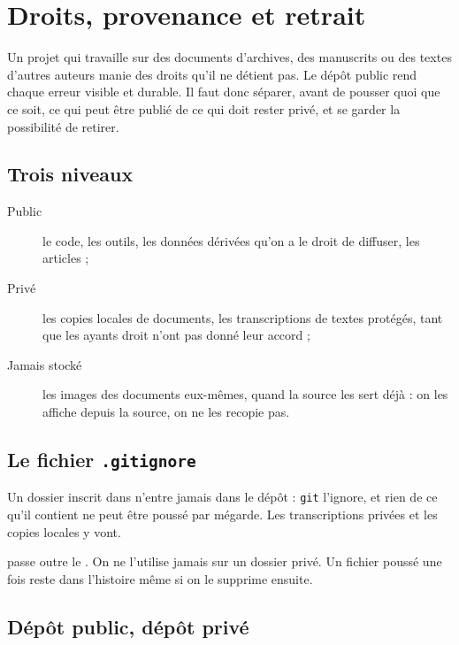 \chapter{Droits, provenance et retrait}\label{ch:droits}

Un projet qui travaille sur des documents d'archives, des manuscrits ou des textes
d'autres auteurs manie des droits qu'il ne détient pas. Le dépôt public rend chaque erreur
visible et durable. Il faut donc séparer, avant de pousser quoi que ce soit, ce qui peut
être publié de ce qui doit rester privé, et se garder la possibilité de retirer.

\section{Trois niveaux}

\begin{description}
  \item[Public] le code, les outils, les données dérivées qu'on a le droit de diffuser,
        les articles ;
  \item[Privé] les copies locales de documents, les transcriptions de textes protégés,
        tant que les ayants droit n'ont pas donné leur accord ;
  \item[Jamais stocké] les images des documents eux-mêmes, quand la source les sert déjà :
        on les affiche depuis la source, on ne les recopie pas.
\end{description}

\section{Le fichier \texttt{.gitignore}}

Un dossier inscrit dans  n'entre jamais dans le dépôt : \texttt{git}
l'ignore, et rien de ce qu'il contient ne peut être poussé par mégarde. Les transcriptions
privées et les copies locales y vont.

\begin{warningblock}
 passe outre le . On ne l'utilise jamais sur un dossier
privé. Un fichier poussé une fois reste dans l'histoire même si on le supprime ensuite.
\end{warningblock}

\section{Dépôt public, dépôt privé}

